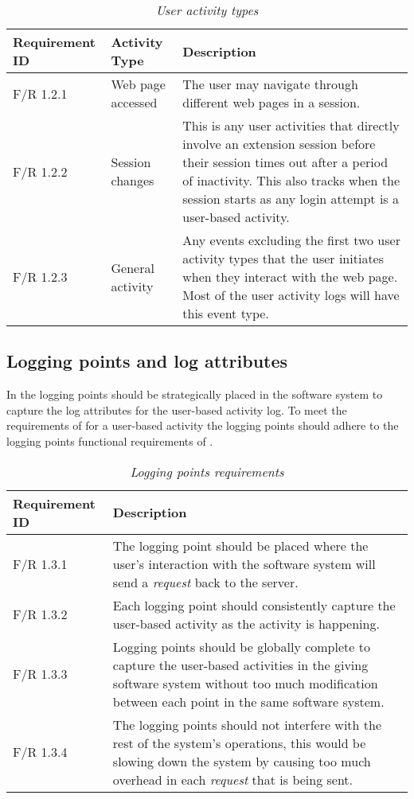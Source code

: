 \begin{table}[!htb]
	\centering
	\small
	\caption[User activity types]
	{\textit{User activity types}}
	\label{tbl:ch2:userActivityTypes}
	\begin{tabularx}{\textwidth}{|l|l|X|}
		\hline \textbf{Requirement ID} & \textbf{Activity Type} & \textbf{Description} \\
		\hline F/R 1.2.1 & Web page accessed & The user may navigate through different web pages in a session.\\
		\hline F/R 1.2.2 & Session changes & This is any user activities that directly involve an extension session before their session times out after a period of inactivity. This also tracks when
		the session starts as any login attempt is a user-based activity.\\
		\hline F/R 1.2.3 & General activity & Any events excluding the first two user activity types that the user initiates when they interact with the web page. Most of the user activity logs will
		have this event type.\\ 
		\hline
	\end{tabularx}
\end{table}

\subsection{Logging points and log attributes}\label{sec:ch2:loggingPoints}
In  the logging points should be strategically placed in the software system to capture the log attributes for the user-based activity log. To meet the requirements of  for a user-based activity the logging points should adhere to the logging points functional requirements of .

\begin{table}[!htb]
	\centering
	\small
	\caption[Logging points requirements]
	{\textit{Logging points requirements}}
	\label{tbl:ch2_loggingPointRequirement}
	\begin{tabularx}{\textwidth}{|l|X|}
		\hline \textbf{Requirement ID} & \textbf{Description} \\
		\hline F/R 1.3.1 & The logging point should be placed where the user's interaction with the software system will send a \textit{request} back to the server.\\
		\hline F/R 1.3.2 & Each logging point should consistently capture the user-based activity as the activity is happening. \\
		\hline F/R 1.3.3 & Logging points should be globally complete to capture the user-based activities in the giving software system without too much modification between each point in the same
		software system. \\
		\hline F/R 1.3.4 & The logging points should not interfere with the rest of the system's operations, this would be slowing down the system by causing too much overhead in each \textit{request}
		that is being sent. \\
		\hline
	\end{tabularx}
\end{table}

